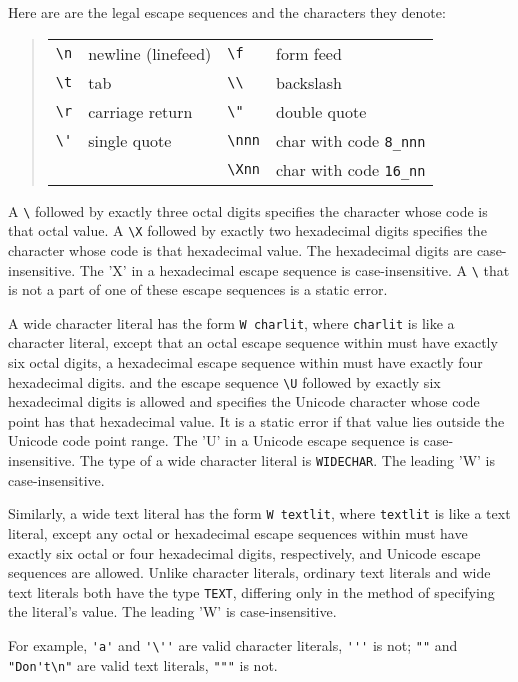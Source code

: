 \documentclass[10pt]{article}
\begin{document}
Here are are the legal escape sequences and the characters they denote:
\begin{quote}
  \begin{tabular}{llll}
    \verb|\n| & newline (linefeed) & \verb|\f| & form feed \\
    \verb|\t| & tab                & \verb|\\| & backslash \\
    \verb|\r| & carriage return    & \verb|\"| & double quote \\
    \verb|\'| & single quote       & \verb|\nnn| & char with code \verb|8_nnn| \\
              &                    & \verb|\Xnn| & char with code \verb|16_nn| \\
  \end{tabular}
\end{quote}
A \verb|\| followed by exactly three octal digits specifies the character
whose code is that octal value.  
A \verb|\X| followed by exactly two hexadecimal digits specifies the character
whose code is that hexadecimal value.  
The hexadecimal digits are case-insensitive. 
The 'X' in a hexadecimal escape sequence is case-insensitive.  
A \verb|\| that is not a part of one of these
escape sequences is a static error.

A wide character literal has the form \verb|W charlit|, where \verb|charlit|
is like a character literal, except that an octal escape sequence
within must have exactly six octal digits, a hexadecimal escape sequence 
within must have exactly four hexadecimal digits. and the escape 
sequence \verb|\U| followed by exactly six hexadecimal digits is allowed and
specifies the Unicode character whose code point has that hexadecimal value.  
It is a static error if that value lies outside the Unicode code point range. 
The 'U' in a Unicode escape sequence is case-insensitive.  
The type of a wide character literal is \verb|WIDECHAR|.
The leading 'W' is case-insensitive. 

Similarly, a wide text literal has the form \verb|W textlit|, 
where \verb|textlit| is like a text literal, except any octal or hexadecimal
escape sequences within must have exactly six octal or four hexadecimal 
digits, respectively, and Unicode escape sequences are allowed.  
Unlike character literals, ordinary text literals and wide text literals 
both have the type \verb|TEXT|, differing only in the method of specifying 
the literal's value. 
The leading 'W' is case-insensitive. 

For example, \verb|'a'| and \verb|'\''| are valid character literals,
\verb|'''| is not; \verb|""| and \verb|"Don't\n"| are valid text literals,
\verb|"""| is not.
\end{document}
